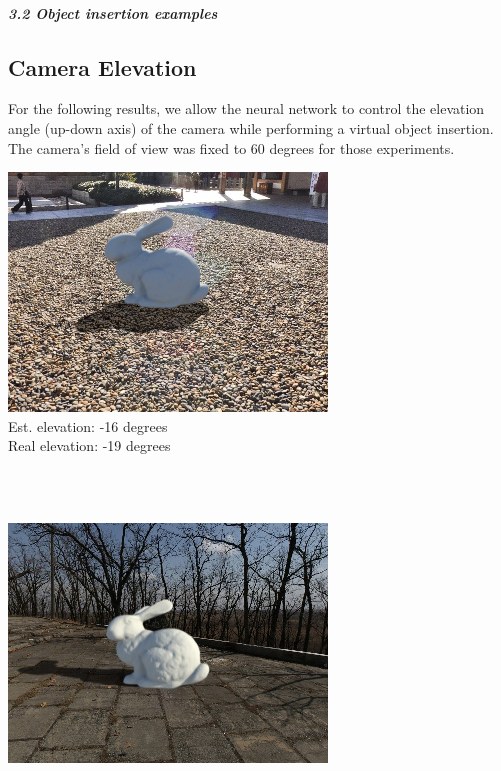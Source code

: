 \protect\hypertarget{camparaminsertionex}{}{}

\hypertarget{object-insertion-examples}{%
\subparagraph{3.2 Object insertion
examples}\label{object-insertion-examples}}

\subsection{Camera Elevation}

For the following results, we allow the neural network to control the
elevation angle (up-down axis) of the camera while performing a virtual
object insertion. The camera's field of view was fixed to 60 degrees for
those experiments.

\begin{multicols}{2}

\begin{minipage}{\linewidth}
\includegraphics[width=\mywidth]{pano_aaqpmaoqocdqfu_005.jpg}\\
Est. elevation: -16 degrees\\
Real elevation: -19 degrees\\
\end{minipage} \\
~\\
\begin{minipage}{\linewidth}
\includegraphics[width=\mywidth]{pano_aczfirgbavyyri_002.jpg}\\

\end{minipage}
\end{multicols}
